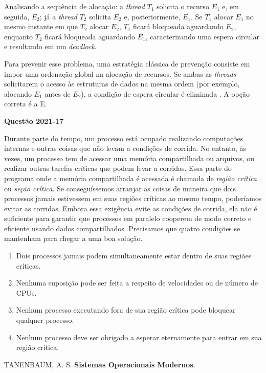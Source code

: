 \documentclass[12pt,a4paper]{article}
\newenvironment{Question}[1]{%
    \pdfbookmark[3]{Questão #1}{q:#1}
    \label{q:#1}
    \par\bigskip\noindent
    \textbf{Questão #1} \dotfill
    \par\noindent
    \nopagebreak
    \ignorespaces
}{%
    \noindent\dotfill
}
\begin{document}
Analisando a sequência de alocação:
a \textit{thread} $T_1$ solicita o recurso $E_1$ e, em seguida, $E_2$;
já a \textit{thread} $T_2$ solicita $E_2$ e, posteriormente, $E_1$.
Se $T_1$ alocar $E_1$ no mesmo instante em que $T_2$ alocar $E_2$,
$T_1$ ficará bloqueada aguardando $E_2$, enquanto $T_2$ ficará bloqueada aguardando $E_1$,
caracterizando uma espera circular e resultando em um \textit{deadlock}.

Para prevenir esse problema, uma estratégia clássica de prevenção consiste em impor uma ordenação global na alocação de recursos.
Se ambas as \textit{threads} solicitarem o acesso às estruturas de dados na mesma ordem (por exemplo, alocando $E_1$ antes de $E_2$),
a condição de espera circular é eliminada \parencite[seç.~6.5]{tanenbaum2016}.
A opção correta é a E.

\begin{Question}{2021-17}
Durante parte do tempo, um processo está ocupado realizando computações internas e outras coisas que não levam a condições de corrida.
No entanto, às vezes, um processo tem de acessar uma memória compartilhada ou arquivos,
ou realizar outras tarefas críticas que podem levar a corridas.
Essa parte do programa onde a memória compartilhada é acessada é chamada de \emph{região crítica} ou \emph{seção crítica}.
Se conseguíssemos arranjar as coisas de maneira que dois processos jamais estivessem em suas regiões críticas ao mesmo tempo,
poderíamos evitar as corridas.
Embora essa exigência evite as condições de corrida,
ela não é suficiente para garantir que processos em paralelo cooperem de modo correto e eficiente usando dados compartilhados.
Precisamos que quatro condições se mantenham para chegar a uma boa solução.
\begin{enumerate}
    \item Dois processos jamais podem simultaneamente estar dentro de suas regiões críticas.
    \item Nenhuma suposição pode ser feita a respeito de velocidades ou de número de CPUs.
    \item Nenhum processo executando fora de sua região crítica pode bloquear qualquer processo.
    \item Nenhum processo deve ser obrigado a esperar eternamente para entrar em sua região crítica.
\end{enumerate}
\vspace{-0.5em}
\begin{flushright}
    \scriptsize
    TANENBAUM, A. S. \textbf{Sistemas Operacionais Modernos}.\\

\end{flushright}
\end{Question}
\end{document}
